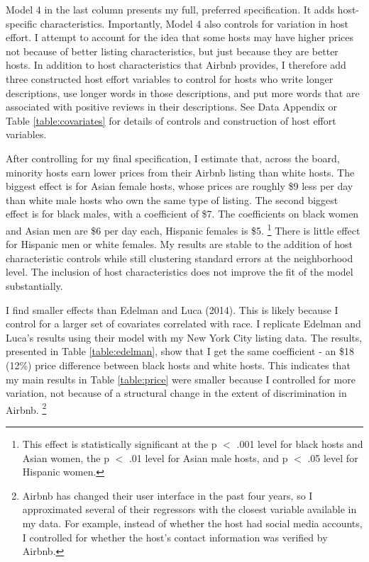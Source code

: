 
Model 4 in the last column presents my full, preferred specification. It adds host-specific characteristics. Importantly, Model 4 also controls for variation in host effort. I attempt to account for the idea that some hosts may have higher prices not because of better listing characteristics, but just because they are better hosts. In addition to host characteristics that Airbnb provides, I therefore add three constructed host effort variables to control for hosts who write longer descriptions, use longer words in those descriptions, and put more words that are associated with positive reviews in their descriptions. See Data Appendix or Table \ref{table:covariates} for details of controls and construction of host effort variables. 

After controlling for my final specification, I estimate that, across the board, minority hosts earn lower prices from their Airbnb listing than white hosts. The biggest effect is for Asian female hosts, whose prices are roughly \$9 less per day than white male hosts who own the same type of listing. The second biggest effect is for black males, with a coefficient of \$7. The coefficients on black women and Asian men are \$6 per day each, Hispanic females is \$5.%
	\footnote{This effect is statistically significant at the p $<$ .001 level for black hosts and Asian women, the p $<$ .01 level for Asian male hosts, and p $<$ .05 level for Hispanic women.}  
There is little effect for Hispanic men or white females. My results are stable to the addition of host characteristic controls while still clustering standard errors at the neighborhood level. The inclusion of host characteristics does not improve the fit of the model substantially.  

I find smaller effects than Edelman and Luca (2014). This is likely because I control for a larger set of covariates correlated with race. I replicate Edelman and Luca's results using their model with my New York City listing data. The results, presented in Table \ref{table:edelman}, show that I get the same coefficient - an \$18 (12\%) price difference between black hosts and white hosts. This indicates that my main results in Table \ref{table:price} were smaller because I controlled for more variation, not because of a structural change in the extent of discrimination in Airbnb.%
	\footnote{Airbnb has changed their user interface in the past four years, so I approximated several of their regressors with the closest variable available in my data. For example, instead of whether the host had social media accounts, I controlled for whether the host's contact information was verified by Airbnb.}



